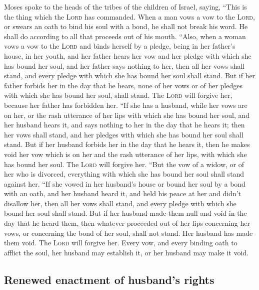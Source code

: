  Moses spoke to the heads of the tribes of the children of
Israel, saying, ``This is the thing which the \textsc{Lord} has
commanded.  When a man vows a vow to the \textsc{Lord}, or
swears an oath to bind his soul with a bond, he shall not break his
word. He shall do according to all that proceeds out of his mouth.
 ``Also, when a woman vows a vow to the \textsc{Lord} and
binds herself by a pledge, being in her father's house, in her youth,
 and her father hears her vow and her pledge with which
she has bound her soul, and her father says nothing to her, then all her
vows shall stand, and every pledge with which she has bound her soul
shall stand.  But if her father forbids her in the day
that he hears, none of her vows or of her pledges with which she has
bound her soul, shall stand. The \textsc{Lord} will forgive her, because
her father has forbidden her.  ``If she has a husband,
while her vows are on her, or the rash utterance of her lips with which
she has bound her soul,  and her husband hears it, and
says nothing to her in the day that he hears it; then her vows shall
stand, and her pledges with which she has bound her soul shall stand.
 But if her husband forbids her in the day that he hears
it, then he makes void her vow which is on her and the rash utterance of
her lips, with which she has bound her soul. The \textsc{Lord} will
forgive her.  ``But the vow of a widow, or of her who is
divorced, everything with which she has bound her soul shall stand
against her.  ``If she vowed in her husband's house or
bound her soul by a bond with an oath,  and her husband
heard it, and held his peace at her and didn't disallow her, then all
her vows shall stand, and every pledge with which she bound her soul
shall stand.  But if her husband made them null and void
in the day that he heard them, then whatever proceeded out of her lips
concerning her vows, or concerning the bond of her soul, shall not
stand. Her husband has made them void. The \textsc{Lord} will forgive
her.  Every vow, and every binding oath to afflict the
soul, her husband may establish it, or her husband may make it void.

\hypertarget{renewed-enactment-of-husbands-rights}{%
\subsection{Renewed enactment of husband's
rights}\label{renewed-enactment-of-husbands-rights}}

